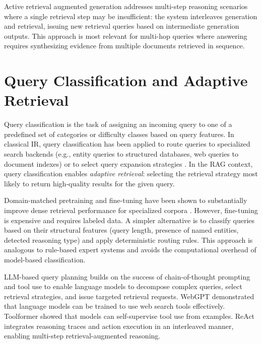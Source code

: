 Active retrieval augmented generation \citep{jiang2023active} addresses multi-step reasoning scenarios where a single retrieval step may be insufficient: the system interleaves generation and retrieval, issuing new retrieval queries based on intermediate generation outputs. This approach is most relevant for multi-hop queries where answering requires synthesizing evidence from multiple documents retrieved in sequence.

\section{Query Classification and Adaptive Retrieval}
\label{sec:lit_adaptive}

Query classification is the task of assigning an incoming query to one of a predefined set of categories or difficulty classes based on query features. In classical IR, query classification has been applied to route queries to specialized search backends (e.g., entity queries to structured databases, web queries to document indexes) or to select query expansion strategies \citep{baeza1999modern}. In the RAG context, query classification enables \emph{adaptive retrieval}: selecting the retrieval strategy most likely to return high-quality results for the given query.

Domain-matched pretraining and fine-tuning have been shown to substantially improve dense retrieval performance for specialized corpora \citep{oguz2021domain}. However, fine-tuning is expensive and requires labeled data. A simpler alternative is to classify queries based on their structural features (query length, presence of named entities, detected reasoning type) and apply deterministic routing rules. This approach is analogous to rule-based expert systems and avoids the computational overhead of model-based classification.

LLM-based query planning builds on the success of chain-of-thought prompting \citep{wei2022chain} and tool use \citep{schick2023toolformer,yao2023react} to enable language models to decompose complex queries, select retrieval strategies, and issue targeted retrieval requests. WebGPT \citep{nakano2022webgpt} demonstrated that language models can be trained to use web search tools effectively. Toolformer \citep{schick2023toolformer} showed that models can self-supervise tool use from examples. ReAct \citep{yao2023react} integrates reasoning traces and action execution in an interleaved manner, enabling multi-step retrieval-augmented reasoning.

